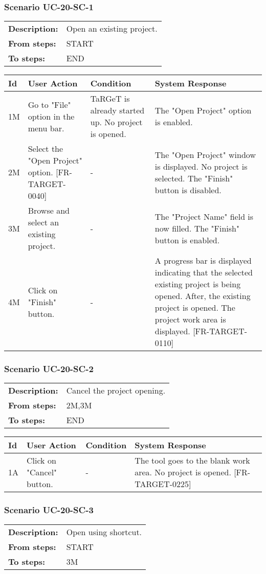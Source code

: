 \documentclass[a4paper,11pt]{article}
\newcommand{\bl}{\\ \hline}
\begin{document}
\subsubsection*{Scenario UC-20-SC-1}
\begin{tabular}{p{1in}p{4in}}
{\bf Description:} & Open an existing project. \\
{\bf From steps:} & START \\
{\bf To steps:} & END \\
\end{tabular}
 
\begin{tabular}{|p{0.8in}|p{1.6in}|p{1.6in}|p{1.6in}|}
\hline
Id & User Action & Condition & System Response  \bl 
1M & Go to "File" option in the menu bar. & TaRGeT is already started up. No project is opened. & The "Open Project" option is enabled. \bl 
2M & Select the "Open Project" option. [FR-TARGET-0040] & - & The "Open Project" window is displayed. No project is selected. The "Finish" button is disabled. \bl 
3M & Browse and select an existing project. & - & The "Project Name" field is now filled. The "Finish" button is enabled. \bl 
4M & Click on "Finish" button. & - & A progress bar is displayed indicating that the selected existing project is being opened. After, the existing project is opened. The project work area is displayed. [FR-TARGET-0110] \bl 
\end{tabular}
\subsubsection*{Scenario UC-20-SC-2}
\begin{tabular}{p{1in}p{4in}}
{\bf Description:} & Cancel the project opening. \\
{\bf From steps:} & 2M,3M \\
{\bf To steps:} & END \\
\end{tabular}
 
\begin{tabular}{|p{0.8in}|p{1.6in}|p{1.6in}|p{1.6in}|}
\hline
Id & User Action & Condition & System Response  \bl 
1A & Click on "Cancel" button. & - & The tool goes to the blank work area. No project is opened. [FR-TARGET-0225] \bl 
\end{tabular}
\subsubsection*{Scenario UC-20-SC-3}
\begin{tabular}{p{1in}p{4in}}
{\bf Description:} & Open using shortcut. \\
{\bf From steps:} & START \\
{\bf To steps:} & 3M \\
\end{tabular}
 
\end{document}
